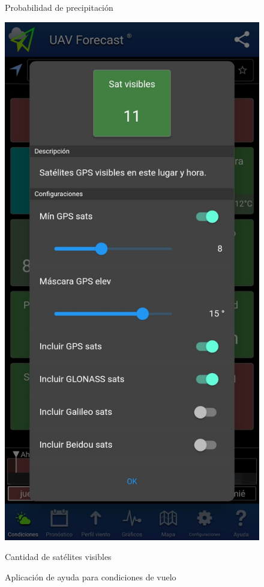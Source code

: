 \begin{figure}[htbp]
\begin{minipage}[b]{0.3\textwidth}
		\caption*{Probabilidad de precipitación}
	\end{minipage}
	\hspace{0.02\textwidth} %
	\begin{minipage}[b]{0.3\textwidth}
		\centering
		\includegraphics[width=\textwidth]{imagenes/app3}
		\caption*{Cantidad de satélites visibles}
	\end{minipage}
	\caption{Aplicación de ayuda para condiciones de vuelo}
	\label{fig:flight_conditions_app}
\end{figure}

